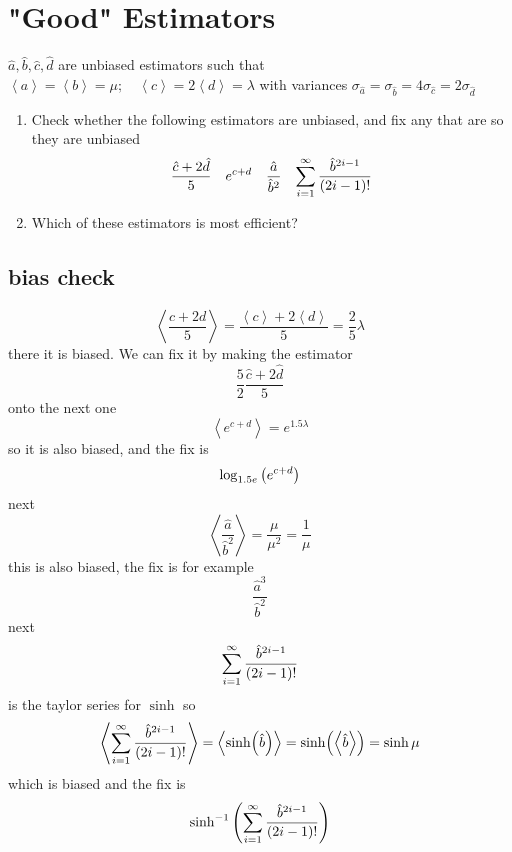 \clearpage
\section{"Good" Estimators}
\begin{colbox}
    \(\hat{a}, \hat{b}, \hat{c}, \hat{d}\) are unbiased estimators such that \(\left<a\right>=\left<b\right>=\mu;\quad\left<c\right>=2\left<d\right>=\lambda\) with variances \(\sigma_{\hat{a}}=\sigma_{\hat{b}}=4\sigma_{\hat{c}}=2\sigma_{\hat{d}}\)
    \begin{enumerate}
        \item Check whether the following estimators are unbiased, and fix any that are so they are unbiased
        \begin{align}
            \frac{\hat{c}+2\hat{d}}{5} && e^{c+d} && \frac{\hat{a}}{\hat{b}^2} && \sum_{i=1}^{\infty}\frac{\hat{b}^{2i-1}}{\left(2i-1\right)!}
        \end{align}
        \item Which of these estimators is most efficient?
    \end{enumerate}
\end{colbox}
\subsection{bias check}
\begin{equation}
    \left<\frac{c+2d}{5}\right> = \frac{\left<c\right>+2\left<d\right>}{5} = \frac{2}{5}\lambda
\end{equation}
there it is biased. We can fix it by making the estimator
\begin{equation}
    \frac{5}{2}\frac{\hat{c}+2\hat{d}}{5}
\end{equation}
onto the next one
\begin{equation}
    \left<e^{c+d}\right> = e^{1.5\lambda}
\end{equation}
so it is also biased, and the fix is
\begin{equation}
    \log_{1.5e}\left(e^{c+d}\right)
\end{equation}
next
\begin{equation}
    \left<\frac{\hat{a}}{\hat{b}^2}\right> = \frac{\mu}{\mu^2} = \frac{1}{\mu}
\end{equation}
this is also biased, the fix is for example
\begin{equation}
    \frac{\hat{a}^3}{\hat{b}^2}
\end{equation}
next
\begin{equation}
    \sum_{i=1}^{\infty}\frac{\hat{b}^{2i-1}}{\left(2i-1\right)!}
\end{equation}
is the taylor series for \(\sinh\) so
\begin{equation}
    \left<\sum_{i=1}^{\infty}\frac{\hat{b}^{2i-1}}{\left(2i-1\right)!}\right> = \left<\sinh(\hat{b})\right> = \sinh(\left<\hat{b}\right>) = \sinh\mu
\end{equation}
which is biased and the fix is
\begin{equation}
    \sinh^{-1}\left(\sum_{i=1}^{\infty}\frac{\hat{b}^{2i-1}}{\left(2i-1\right)!}\right)
\end{equation}
